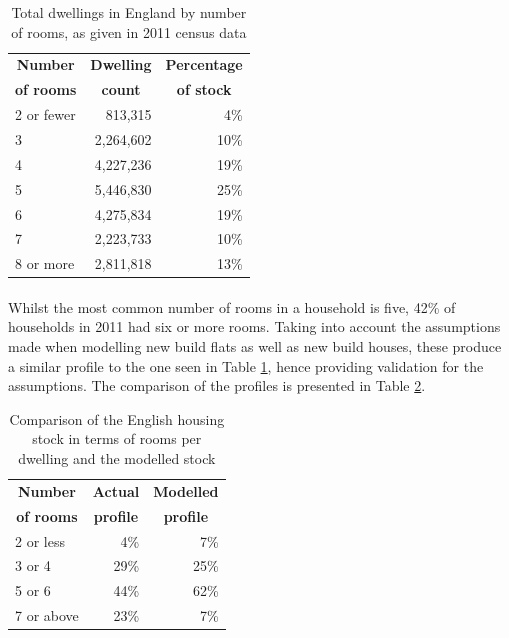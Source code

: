 \documentclass[12pt]{article}
\begin{document}
\begingroup
\linespread{1}
\begin{table}[htbp]
  \centering
  \caption{Total dwellings in England by number of rooms, as given in 2011 census data \citep{Office_for_National_Statistics2011-wb}}
    \begin{tabular}{lrr}
    \toprule
    \multicolumn{1}{c}{\textbf{Number}} & \multicolumn{1}{c}{\textbf{Dwelling}} & \multicolumn{1}{c}{\textbf{Percentage}} \\
     \multicolumn{1}{c}{\textbf{of rooms}} & \multicolumn{1}{c}{\textbf{count}} & \multicolumn{1}{c}{\textbf{of stock}} \\
    \midrule
    2 or fewer & 813,315 & 4\% \\
    3 & 2,264,602 & 10\% \\
    4 & 4,227,236 & 19\% \\
    5 & 5,446,830 & 25\% \\
    6 & 4,275,834 & 19\% \\
    7 & 2,223,733 & 10\% \\
    8 or more & 2,811,818 & 13\% \\
    \bottomrule
    \end{tabular}%
  \label{tab:housecensus}%
\end{table}%
\endgroup

\paragraph{}
Whilst the most common number of rooms in a household is five, 42\% of households in 2011 had six or more rooms. Taking into account the assumptions made when modelling new build flats as well as new build houses, these produce a similar profile to the one seen in Table \ref{tab:housecensus}, hence providing validation for the assumptions. The comparison of the profiles is presented in Table \ref{tab:profilecomparison}.

\begingroup
\linespread{1}
\begin{table}[htbp]
  \centering
  \caption{Comparison of the English housing stock in terms of rooms per dwelling and the modelled stock}
    \begin{tabular}{lrr}
    \toprule
    \multicolumn{1}{c}{\textbf{Number}} & \multicolumn{1}{c}{\textbf{Actual}} & \multicolumn{1}{c}{\textbf{Modelled}} \\
     \multicolumn{1}{c}{\textbf{of rooms}} & \multicolumn{1}{c}{\textbf{profile}} & \multicolumn{1}{c}{\textbf{profile}} \\
    \midrule
    2 or less & 4\%   & 7\% \\
    3 or 4 & 29\%  & 25\% \\
    5 or 6 & 44\%  & 62\% \\
    7 or above & 23\%  & 7\% \\
    \bottomrule
    \end{tabular}%
  \label{tab:profilecomparison}%
\end{table}%
\endgroup
\end{document}
